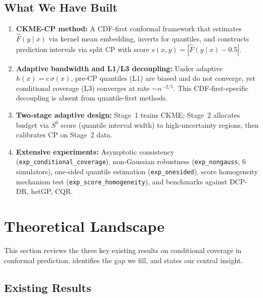 \documentclass[11pt]{article}
\begin{document}
\subsection{What We Have Built}

\begin{enumerate}[label=(\roman*)]
  \item \textbf{CKME-CP method:} A CDF-first conformal framework that
    estimates $\hat F(y \mid x)$ via kernel mean embedding, inverts for
    quantiles, and constructs prediction intervals via split CP with
    score $s(x,y) = |\hat F(y \mid x) - 0.5|$.

  \item \textbf{Adaptive bandwidth and L1/L3 decoupling:} Under
    adaptive $h(x) = c\,\sigma(x)$, pre-CP quantiles (L1) are
    biased and do not converge, yet conditional coverage (L3) converges
    at rate $\sim n^{-2/5}$. This CDF-first-specific decoupling is
    absent from quantile-first methods.

  \item \textbf{Two-stage adaptive design:} Stage~1 trains CKME;
    Stage~2 allocates budget via $S^0$ score (quantile interval width)
    to high-uncertainty regions, then calibrates CP on Stage~2 data.

  \item \textbf{Extensive experiments:}
    Asymptotic consistency (\texttt{exp\_conditional\_coverage}),
    non-Gaussian robustness (\texttt{exp\_nongauss}, 6 simulators),
    one-sided quantile estimation (\texttt{exp\_onesided}),
    score homogeneity mechanism test (\texttt{exp\_score\_homogeneity}),
    and benchmarks against DCP-DR, hetGP, CQR.
\end{enumerate}


\section{Theoretical Landscape}
\label{sec:landscape}

This section reviews the three key existing results on conditional
coverage in conformal prediction, identifies the gap we fill, and
states our central insight.

\subsection{Existing Results}
\end{document}
